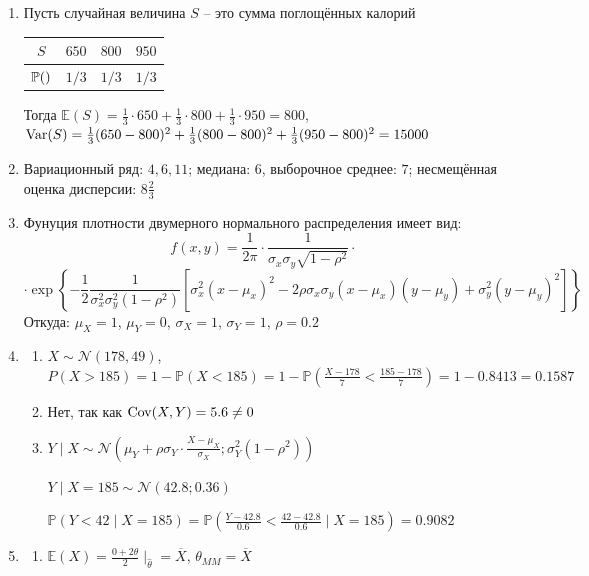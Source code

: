 \documentclass[12pt, a4paper]{article}\usepackage[]{graphicx}\usepackage[]{color}
\begin{document}
						\begin{enumerate}
							\item Пусть случайная величина $S$ – это сумма поглощённых калорий

							\begin{tabular}{c|ccc}
								$S$ & $650$ & $800$ & $950$ \\
								\hline
								$\P()$ & $1/3$ & $1/3$ & $1/3$ \\
							\end{tabular}

							Тогда $\mathbb{E}(S) = \frac{1}{3}\cdot 650 +  \frac{1}{3}\cdot 800 +  \frac{1}{3}\cdot 950 = 800$, $\Var(S) = \frac{1}{3}(650-800)^2 + \frac{1}{3}(800-800)^2 + \frac{1}{3}(950-800)^2 = 15000$
							\item Вариационный ряд: $4, 6, 11$; медиана: $6$, выборочное среднее: $7$; несмещённая оценка дисперсии: $8 \frac{2}{3}$
							\item Фунуция плотности двумерного нормального распределения имеет вид:
							\[
							f(x,y) =  \frac{1}{2\pi}\cdot \frac{1}{\sigma_x \sigma_y \sqrt{1-\rho^2}} \cdot
							\]
							\[\cdot \exp\left\{{-\frac{1}{2}\frac{1}{\sigma_x^2 \sigma_y^2(1-\rho^2)}\left[\sigma_x^2(x-\mu_x)^2-2\rho\sigma_x\sigma_y(x-\mu_x)(y-\mu_y)+\sigma_y^2(y-\mu_y)^2\right]}\right\}
							\]
							Откуда: $\mu_X=1$, $\mu_Y=0$, $\sigma_X = 1$, $\sigma_Y = 1$, $\rho = 0.2$

							\item
							\begin{enumerate}
								\item $X \sim \mathcal{N}(178, 49)$, $P(X>185) = 1  - \mathbb{P}(X<185) = 1- \mathbb{P}\left(\frac{X-178}{7} < \frac{185-178}{7}\right) = 1 - 0.8413 = 0.1587$
								\item Нет, так как $\Cov(X, Y) = 5.6 \neq 0$
								\item $Y \mid X \sim \mathcal{N}\left(\mu_Y + \rho\sigma_Y\cdot\frac{X-\mu_X}{\sigma_X}; \sigma_Y^2(1-\rho^2)\right)$

								$Y \mid X=185 \sim \mathcal{N}(42.8;0.36)$

								$\mathbb{P}(Y<42 \mid X=185) = \mathbb{P}\left(\frac{Y-42.8}{0.6} < \frac{42-42.8}{0.6}\mid X=185\right) = 0.9082$
							\end{enumerate}

							\item
							\begin{enumerate}
								\item $\mathbb{E}(X) = \frac{0+2\theta}{2}\mid_{\hat{\theta}} = \overline{X}$, $\theta_{MM} = \overline{X}$
							\end{enumerate}


\end{enumerate}
\end{document}
